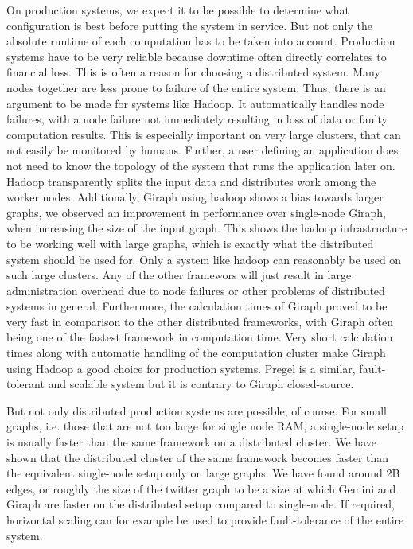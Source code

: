 On production systems, we expect it to be possible to determine what configuration is best before putting the system in service.
But not only the absolute runtime of each computation has to be taken into account. Production systems have to be very reliable because downtime often directly correlates to financial loss.
This is often a reason for choosing a distributed system. Many nodes together are less prone to failure of the entire system.
Thus, there is an argument to be made for systems like Hadoop.
It automatically handles node failures, with a node failure not immediately resulting in loss of data or faulty computation results.
This is especially important on very large clusters, that can not easily be monitored by humans.
Further, a user defining an application does not need to know the topology of the system that runs the application later on.
Hadoop transparently splits the input data and distributes work among the worker nodes.
Additionally, Giraph using hadoop shows a bias towards larger graphs, we observed an improvement in performance over single-node Giraph, when increasing the size of the input graph.
This shows the hadoop infrastructure to be working well with large graphs, which is exactly what the distributed system should be used for. 
Only a system like hadoop can reasonably be used on such large clusters.
Any of the other framewors will just result in large administration overhead due to node failures or other problems of distributed systems in general.
Furthermore, the calculation times of Giraph proved to be very fast in comparison to the other distributed frameworks, with Giraph often being one of the fastest framework in computation time.
Very short calculation times along with automatic handling of the computation cluster make Giraph using Hadoop a good choice for production systems.
Pregel is a similar, fault-tolerant and scalable system but it is contrary to Giraph closed-source.

But not only distributed production systems are possible, of course. 
For small graphs, i.e. those that are not too large for single node RAM, a single-node setup is usually faster than the same framework on a distributed cluster. 
We have shown that the distributed cluster of the same framework becomes faster than the equivalent single-node setup only on large graphs.
We have found around 2B edges, or roughly the size of the twitter graph to be a size at which Gemini and Giraph are faster on the distributed setup compared to single-node.
If required, horizontal scaling can for example be used to provide fault-tolerance of the entire system.

